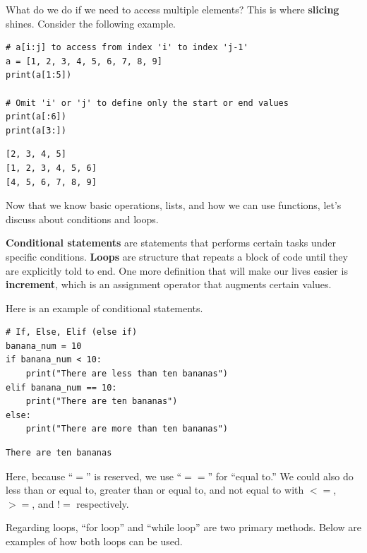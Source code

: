 \documentclass[../../../main.tex]{subfiles}
\begin{document}
What do we do if we need to access multiple elements? This is
where \textbf{slicing} shines. Consider the following example.

\begin{jupyter}
\begin{lstlisting}[style=jin]
# a[i:j] to access from index 'i' to index 'j-1'
a = [1, 2, 3, 4, 5, 6, 7, 8, 9]
print(a[1:5])

# Omit 'i' or 'j' to define only the start or end values
print(a[:6])
print(a[3:])
\end{lstlisting}

\begin{lstlisting}[style=jout]
[2, 3, 4, 5]
[1, 2, 3, 4, 5, 6]
[4, 5, 6, 7, 8, 9]
\end{lstlisting}
\end{jupyter}

Now that we know basic operations, lists, and how we can use
functions, let's discuss about conditions and loops.

\begin{definition}{}{}
\textbf{Conditional statements} are statements that performs
certain tasks under specific conditions. \textbf{Loops} are
structure that repeats a block of code until they are explicitly
told to end. One more definition that will make our lives easier is
\textbf{increment}, which is an assignment operator that augments
certain values.
\end{definition}

Here is an example of conditional statements.

\begin{jupyter}
\begin{lstlisting}[style=jin]
# If, Else, Elif (else if)
banana_num = 10
if banana_num < 10:
    print("There are less than ten bananas")
elif banana_num == 10:
    print("There are ten bananas")
else:
    print("There are more than ten bananas")
\end{lstlisting}

\begin{lstlisting}[style=jout]
There are ten bananas
\end{lstlisting}
\end{jupyter}

Here, because ``$=$'' is reserved, we use ``$==$'' for ``equal to.''
We could also do less than or equal to, greater than or equal to,
and not equal to with $<=$, $>=$, and $!=$ respectively.

Regarding loops, ``for loop'' and ``while loop'' are two primary
methods. Below are examples of how both loops can be used.
\end{document}
